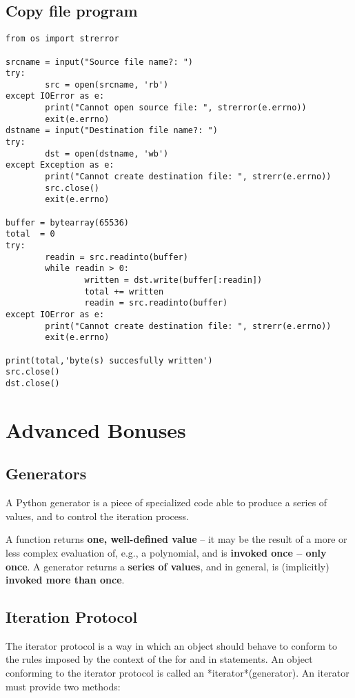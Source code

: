 \documentclass[11pt]{article}
\begin{document}
\subsection{Copy file program}
\label{sec:orgbd714cc}

\begin{verbatim}
from os import strerror

srcname = input("Source file name?: ")
try:
        src = open(srcname, 'rb')
except IOError as e:
        print("Cannot open source file: ", strerror(e.errno))
        exit(e.errno)	
dstname = input("Destination file name?: ")
try:
        dst = open(dstname, 'wb')
except Exception as e:
        print("Cannot create destination file: ", strerr(e.errno))
        src.close()
        exit(e.errno)	

buffer = bytearray(65536)
total  = 0
try:
        readin = src.readinto(buffer)
        while readin > 0:
                written = dst.write(buffer[:readin])
                total += written
                readin = src.readinto(buffer)
except IOError as e:
        print("Cannot create destination file: ", strerr(e.errno))
        exit(e.errno)	

print(total,'byte(s) succesfully written')
src.close()
dst.close()
\end{verbatim}

\newpage

\section{Advanced Bonuses}
\label{sec:orgc761bdf}
\subsection{Generators}
\label{sec:org594bd1a}
A Python generator is a piece of specialized code able to produce a
series of values, and to control the iteration process.

A function returns \textbf{one, well-defined value} – it may be the result of
a more or less complex evaluation of, e.g., a polynomial, and is
\textbf{invoked once – only once}.  A generator returns a \textbf{series of values}, and
in general, is (implicitly) \textbf{invoked more than once}.
\subsection{Iteration Protocol}
\label{sec:org5ad57d6}
The iterator protocol is a way in which an object should behave to
conform to the rules imposed by the context of the for and in
statements. An object conforming to the iterator protocol is called an
*iterator*(generator). An iterator must provide two methods:
\end{document}
